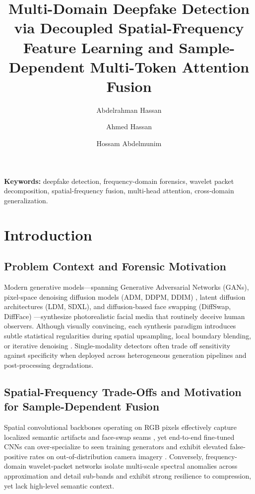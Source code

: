 \documentclass[fleqn,10pt]{wlscirep}
\title{Multi-Domain Deepfake Detection via Decoupled Spatial-Frequency Feature Learning and Sample-Dependent Multi-Token Attention Fusion}
\author[1,*]{Abdelrahman Hassan}
\author[1]{Ahmed Hassan}
\author[1]{Hossam Abdelmunim}
\affil[1]{Computer and Systems Engineering Department, Faculty of Engineering, Ain Shams University, Cairo, Egypt}
\affil[*]{2201662@eng.asu.edu.eg}
\begin{document}
\flushbottom
\maketitle
\thispagestyle{empty}

\noindent\textbf{Keywords:} deepfake detection, frequency-domain forensics, wavelet packet decomposition, spatial-frequency fusion, multi-head attention, cross-domain generalization.

\section*{Introduction}

\subsection*{Problem Context and Forensic Motivation}
Modern generative models---spanning Generative Adversarial Networks (GANs), pixel-space denoising diffusion models (ADM, DDPM, DDIM) \cite{ref1,ref2,ref3}, latent diffusion architectures (LDM, SDXL), and diffusion-based face swapping (DiffSwap, DiffFace) \cite{ref16,ref21}---synthesize photorealistic facial media that routinely deceive human observers. Although visually convincing, each synthesis paradigm introduces subtle statistical regularities during spatial upsampling, local boundary blending, or iterative denoising \cite{ref4,ref5}. Single-modality detectors often trade off sensitivity against specificity when deployed across heterogeneous generation pipelines and post-processing degradations.

\subsection*{Spatial-Frequency Trade-Offs and Motivation for Sample-Dependent Fusion}
Spatial convolutional backbones operating on RGB pixels effectively capture localized semantic artifacts and face-swap seams \cite{ref4,ref28}, yet end-to-end fine-tuned CNNs can over-specialize to seen training generators and exhibit elevated false-positive rates on out-of-distribution camera imagery \cite{ref5,ref31}. Conversely, frequency-domain wavelet-packet networks isolate multi-scale spectral anomalies across approximation and detail sub-bands \cite{ref8} and exhibit strong resilience to compression, yet lack high-level semantic context.
\end{document}
